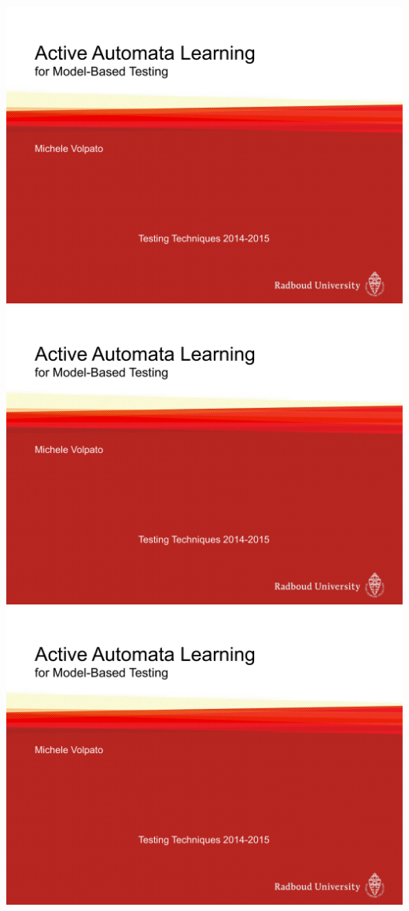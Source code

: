 \includegraphics[page=2,scale=0.25,trim={0 7cm 0 0},clip]{slides/learningmealy.pdf}
\includegraphics[page=3,scale=0.25,trim={0 7cm 0 0},clip]{slides/learningmealy.pdf}
\includegraphics[page=5,scale=0.25,trim={0 5cm 0 0},clip]{slides/learningmealy.pdf}

